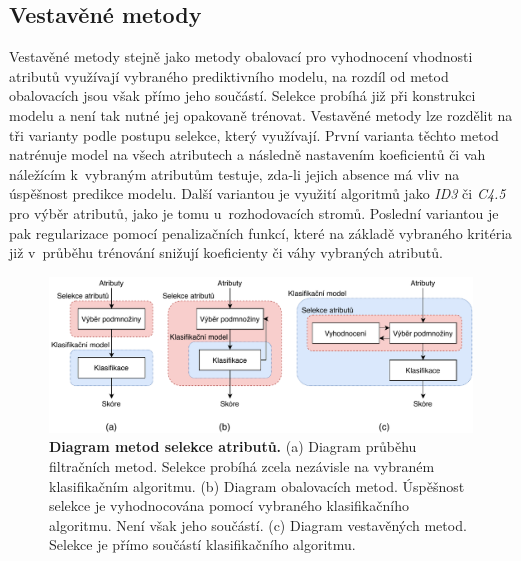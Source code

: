 \subsection*{Vestavěné metody}
\label{vestavene_metody}
Vestavěné metody stejně jako metody obalovací pro vyhodnocení vhodnosti atributů využívají vybraného prediktivního modelu, na rozdíl od metod obalovacích jsou však přímo jeho součástí. Selekce probíhá již při konstrukci modelu a není tak nutné jej opakovaně trénovat. Vestavěné metody lze rozdělit na tři varianty podle postupu selekce, který využívají. První varianta těchto metod natrénuje model na všech atributech a následně nastavením koeficientů či vah náležícím k~vybraným atributům testuje, zda-li jejich absence má vliv na úspěšnost predikce modelu. Další variantou je využití algoritmů jako \textit{ID3} či \textit{C4.5} pro výběr atributů, jako je tomu u~rozhodovacích stromů. Poslední variantou je pak regularizace pomocí penalizačních funkcí, které na základě vybraného kritéria již v~průběhu trénování snižují koeficienty či váhy vybraných atributů.\cite{data_classification}

\begin{figure}[h]
    \includegraphics[width=\textwidth]{obrazky/selekce_atributu.pdf}
    \caption{\textbf{Diagram metod selekce atributů.} (a) Diagram průběhu filtračních metod. Selekce probíhá zcela nezávisle na vybraném klasifikačním algoritmu. (b) Diagram obalovacích metod. Úspěšnost selekce je vyhodnocována pomocí vybraného klasifikačního algoritmu. Není však jeho součástí. (c) Diagram vestavěných metod. Selekce je přímo součástí klasifikačního algoritmu.}
    \label{obr_selekce_atributu}
\end{figure}

